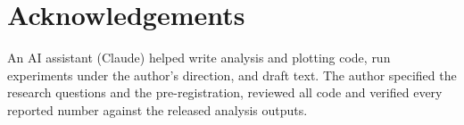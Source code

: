 \documentclass[11pt]{article}
\begin{document}
\section*{Acknowledgements}
An AI assistant (Claude) helped write analysis and plotting code, run experiments under the
author's direction, and draft text. The author specified the research questions and the
pre-registration, reviewed all code and verified every reported number against the released
analysis outputs.



\appendix


\end{document}
